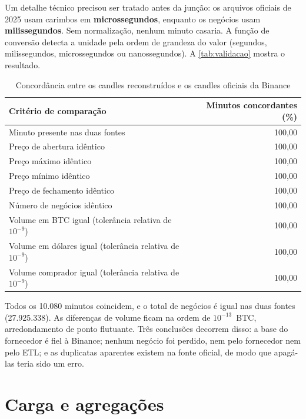 Um detalhe técnico precisou ser tratado antes da junção: os arquivos oficiais de
2025 usam carimbos em \textbf{microssegundos}, enquanto os negócios usam
\textbf{milissegundos}. Sem normalização, nenhum minuto casaria. A função de
conversão detecta a unidade pela ordem de grandeza do valor (segundos,
milissegundos, microssegundos ou nanossegundos). A \autoref{tab:validacao}
mostra o resultado.

\begin{table}[htbp]
\caption{\label{tab:validacao}Concordância entre os candles reconstruídos e os candles oficiais da Binance}
\begin{corpotabela}
\begin{tabular}{lr}
\toprule
Critério de comparação & Minutos concordantes (\%) \\
\midrule
Minuto presente nas duas fontes & 100,00 \\
Preço de abertura idêntico & 100,00 \\
Preço máximo idêntico & 100,00 \\
Preço mínimo idêntico & 100,00 \\
Preço de fechamento idêntico & 100,00 \\
Número de negócios idêntico & 100,00 \\
Volume em BTC igual (tolerância relativa de $10^{-9}$) & 100,00 \\
Volume em dólares igual (tolerância relativa de $10^{-9}$) & 100,00 \\
Volume comprador igual (tolerância relativa de $10^{-9}$) & 100,00 \\
\bottomrule
\end{tabular}
\end{corpotabela}
\end{table}

Todos os 10.080 minutos coincidem, e o total de negócios é igual nas duas
fontes (27.925.338). As diferenças de volume ficam na ordem de $10^{-13}$~BTC,
arredondamento de ponto flutuante. Três conclusões decorrem disso: a base do
fornecedor é fiel à Binance; nenhum negócio foi perdido, nem pelo fornecedor nem
pelo ETL; e as duplicatas aparentes existem na fonte oficial, de modo que
apagá-las teria sido um erro.

\section{Carga e agregações}\label{sec:carga}

